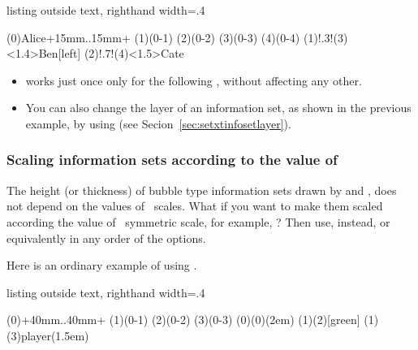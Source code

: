 \begin{tcblisting}{listing outside text, righthand width=.4\linewidth}
\begin{istgame}[yscale=1.5,font=\scriptsize]
\xtdistance{10mm}{10mm}
\istroot(0){Alice}+15mm..15mm+
      \istb \istb \istb \istb \endist
\istroot(1)(0-1)  \istb \istb \endist
\istroot(2)(0-2)  \istb \istb \endist
\istroot(3)(0-3)  \istb \istb \endist
\istroot(4)(0-4)  \istb \istb \endist
{}
\xtCInfosetO[fill=blue!20]
   (1)!.3!(3)<1.4>{Ben}[left]
\xtCInfosetO[fill=red!40]
   (2)!.7!(4)<1.5>{Cate}
\end{istgame}
\end{tcblisting}

\remark
\begin{itemize}\tightlist
\item
\cmd{\xtCInfosetOTurnX} works just once only for the following \cmd{\xtCInfosetO}, without affecting any other.
\item
You can also change the layer of an information set, as shown in the previous example, by using \icmd{\setxtinfosetlayer} (see Secion~\ref{sec:setxtinfosetlayer}).
\end{itemize}


\subsubsection{Scaling information sets according to the value of \TikZ\ }
\label{ssec:scaleissue}

The height (or thickness) of bubble type information sets drawn by \cmd{\xtInfosetO} and \cmd{\xtCInfosetO},
does not depend on the values of \TikZ\ scales.
What if you want to make them scaled according the value of \TikZ\ symmetric scale, for example, \xw{[scale=.5]}?
Then use, instead, \xw{[scale=.5,xscale=1]} or equivalently \xw{[yscale=1,scale=.5]} in any order of the options.

Here is an ordinary example of using \xw{[scale=.5]}.

\begin{tcblisting}{listing outside text, righthand width=.4\linewidth}
\begin{istgame}[scale=.5]
\xtdistance{40mm}{30mm}
\istroot(0)+40mm..40mm+
            \istb \istb \istb \endist
\istroot(1)(0-1)  \istb \istb \endist
\istroot(2)(0-2)  \istb \istb \endist
\istroot(3)(0-3)  \istb \istb \endist
\xtCInfosetO(0)(0)(2em)
\xtInfosetO[fill=green](1)(2)[green]
\xtCInfosetO(1)(3){player}(1.5em)
\end{istgame}
\end{tcblisting}


